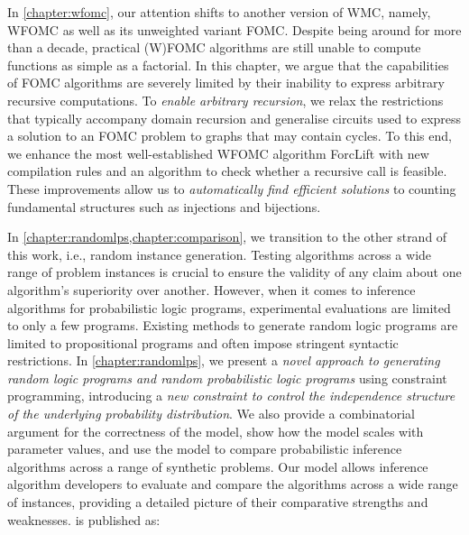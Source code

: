 
In \cref{chapter:wfomc}, our attention shifts to another version of WMC, namely,
WFOMC as well as its unweighted variant FOMC\@. Despite being around for more
than a decade, practical (W)FOMC algorithms are still unable to compute
functions as simple as a factorial. In this chapter, we argue that the
capabilities of FOMC algorithms are severely limited by their inability to
express arbitrary recursive computations. To \emph{enable arbitrary recursion},
we relax the restrictions that typically accompany domain recursion and
generalise circuits used to express a solution to an FOMC problem to graphs that
may contain cycles. To this end, we enhance the most well-established WFOMC
algorithm ForcLift \citep{DBLP:conf/ijcai/BroeckTMDR11} with new compilation
rules and an algorithm to check whether a recursive call is feasible. These
improvements allow us to \emph{automatically find efficient solutions} to
counting fundamental structures such as injections and bijections.


In \cref{chapter:randomlps,chapter:comparison}, we transition to the other
strand of this work, i.e., random instance generation. Testing algorithms across
a wide range of problem instances is crucial to ensure the validity of any claim
about one algorithm's superiority over another. However, when it comes to
inference algorithms for probabilistic logic programs, experimental evaluations
are limited to only a few programs. Existing methods to generate random logic
programs are limited to propositional programs and often impose stringent
syntactic restrictions. In \cref{chapter:randomlps}, we present a \emph{novel
  approach to generating random logic programs and random probabilistic logic
  programs} using constraint programming, introducing a \emph{new constraint to
  control the independence structure of the underlying probability
  distribution}. We also provide a combinatorial argument for the correctness of
the model, show how the model scales with parameter values, and use the model to
compare probabilistic inference algorithms across a range of synthetic problems.
Our model allows inference algorithm developers to evaluate and compare the
algorithms across a wide range of instances, providing a detailed picture of
their comparative strengths and weaknesses.  is
published as:
\begin{displayquote}
\end{displayquote}

